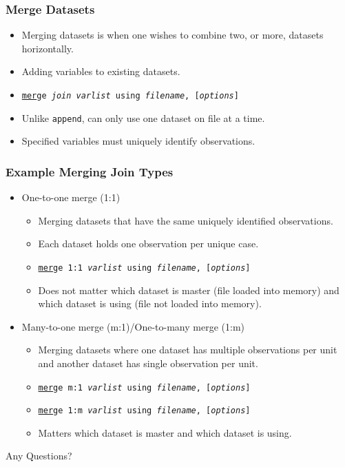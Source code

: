\documentclass{beamer}
\begin{document}
\begin{frame}
	\frametitle{Merge Datasets}
		\begin{itemize}
			\item Merging datasets is when one wishes to combine two, or more, datasets horizontally.
			\item Adding variables to existing datasets.
			\item \texttt{\underline{mer}ge \emph{join} \textit{varlist} using \textit{filename}, [\textit{options}]}
			\item Unlike \texttt{append}, can only use one dataset on file at a time.
			\item Specified variables must uniquely identify observations.
		\end{itemize}
\end{frame}

\begin{frame}
	\frametitle{Example Merging Join Types}
		\begin{itemize}
			\item One-to-one merge (1:1)
				\begin{itemize}
					\item Merging datasets that have the same uniquely identified observations.
					\item Each dataset holds one observation per unique case.
					\item \texttt{\underline{mer}ge 1:1 \textit{varlist} using \textit{filename}, [\textit{options}]}
					\item Does not matter which dataset is master (file loaded into memory) and which dataset is using (file not loaded into memory).
				\end{itemize}
			\item Many-to-one merge (m:1)/One-to-many merge (1:m)
				\begin{itemize}
					\item Merging datasets where one dataset has multiple observations per unit and another dataset has single observation per unit.
					\item \texttt{\underline{mer}ge m:1 \textit{varlist} using \textit{filename}, [\textit{options}]}
					\item \texttt{\underline{mer}ge 1:m \textit{varlist} using \textit{filename}, [\textit{options}]}
					\item Matters which dataset is master and which dataset is using.
				\end{itemize}
		\end{itemize}
\end{frame}

\begin{frame}
	\begin{center}
		\begin{LARGE}
			Any Questions?
		\end{LARGE}
	\end{center}
\end{frame}
\end{document}
